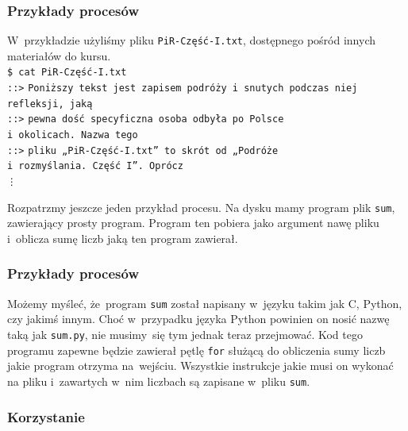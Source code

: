 \documentclass[10pt,t]{beamer}
\begin{document}
\begin{frame}
  \frametitle{Przykłady procesów}


 W~przykładzie użyliśmy pliku
  \texttt{PiR-Część-I.txt}, dostępnego pośród innych materiałów do kursu. \\
  \texttt{\$ cat PiR-Część-I.txt} \\
  \texttt{::>} \texttt{Poniższy tekst jest zapisem podróży i~snutych
    podczas niej refleksji, jaką} \\
  \texttt{::>} \texttt{pewna dość specyficzna osoba odbyła po Polsce} \\
  \texttt{i~okolicach. Nazwa tego} \\
  \texttt{::>} \texttt{pliku „PiR-Część-I.txt” to skrót od „Podróże} \\
  \texttt{i~rozmyślania. Część I”. Oprócz} \\
  \hspace{2em} \texttt{\vdots}

  Rozpatrzmy jeszcze jeden przykład procesu. Na dysku mamy program plik
  \texttt{sum}, zawierający prosty program. Program ten pobiera
  jako argument nawę pliku i~oblicza sumę liczb jaką ten program zawierał.

\end{frame}





\begin{frame}
  \frametitle{Przykłady procesów}


  Możemy myśleć, że~program \texttt{sum} został napisany w~języku takim
  jak C, Python, czy jakimś innym. Choć w~przypadku języka Python powinien
  on nosić nazwę taką jak \texttt{sum.py}, nie musimy~się tym jednak teraz
  przejmować. Kod tego programu zapewne będzie zawierał pętlę \texttt{for}
  służącą do obliczenia sumy liczb jakie program otrzyma na~wejściu.
  Wszystkie instrukcje jakie musi on wykonać na pliku i~zawartych
  w~nim liczbach są zapisane w~pliku \texttt{sum}.

\end{frame}





\begin{frame}
  \frametitle{Korzystanie}




\end{frame}
\end{document}
